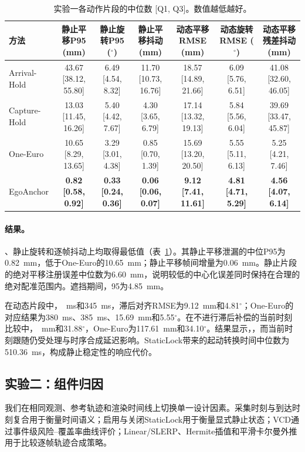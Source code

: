 \documentclass[review]{vgtc}
\newcommand{\system}{EgoAnchor}
\begin{document}
\begin{table}[t]
\centering
\caption{实验一各动作片段的中位数 [Q1, Q3]。数值越低越好。}
\label{tab:exp1}
\small
\begin{tabular}{lcccccc}
\toprule
方法 & 静止平移P95 (mm) & 静止旋转P95 ($^\circ$) & 静止平移抖动 (mm) & 动态平移RMSE (mm) & 动态旋转RMSE ($^\circ$) & 动态平移残差抖动 (mm) \\
\midrule
Arrival-Hold & 43.67 [38.12, 55.80] & 6.49 [4.54, 8.32] & 11.70 [10.73, 16.76] & 18.57 [14.89, 21.66] & 6.09 [5.76, 6.51] & 41.08 [32.60, 46.05] \\
Capture-Hold & 13.03 [11.45, 16.26] & 5.40 [4.42, 7.67] & 4.30 [3.65, 6.79] & 17.14 [13.32, 19.13] & 5.84 [5.56, 6.04] & 39.69 [33.47, 45.87] \\
One-Euro & 10.65 [8.29, 13.65] & 3.29 [3.01, 4.38] & 0.85 [0.70, 1.39] & 15.69 [13.20, 20.50] & 5.55 [5.11, 6.13] & 5.25 [4.21, 7.46] \\
\system & \textbf{0.82 [0.58, 0.92]} & \textbf{0.33 [0.24, 0.36]} & \textbf{0.06 [0.06, 0.07]} & \textbf{9.12 [7.41, 11.61]} & \textbf{4.81 [4.71, 5.29]} & \textbf{4.56 [4.07, 6.14]} \\
\bottomrule
\end{tabular}
\end{table}

\paragraph{结果。}
、静止旋转和逐帧抖动上均取得最低值（表~\ref{tab:exp1}）。其静止平移泄漏的中位P95为0.82~mm，低于One-Euro的10.65~mm；静止平移帧间增量为0.06~mm。静止片段的绝对平移注册误差中位数为6.60~mm，说明较低的中心化误差同时保持在合理的绝对配准范围内。遮挡期间，95为4.85~mm。

在动态片段中，~ms和345~ms，滞后对齐RMSE为9.12~mm和4.81$^{\circ}$；One-Euro的对应结果为380~ms、385~ms、15.69~mm和5.55$^{\circ}$。在不进行滞后补偿的当前时刻比较中，~mm和31.88$^{\circ}$，One-Euro为117.61~mm和34.10$^{\circ}$。结果显示，，而当前时刻跟随仍受处理与时序合成延迟影响。StaticLock带来的起动转换时间中位数为510.36~ms，构成静止稳定性的响应代价。

\subsection{实验二：组件归因}
我们在相同观测、参考轨迹和渲染时间线上切换单一设计因素。采集时刻与到达时刻复合用于衡量时间语义；启用与关闭StaticLock用于衡量显式静止状态；VCD通过事件级风险--覆盖率曲线评价；Linear/SLERP、Hermite插值和平滑卡尔曼外推用于比较逐帧轨迹合成策略。
\end{document}
